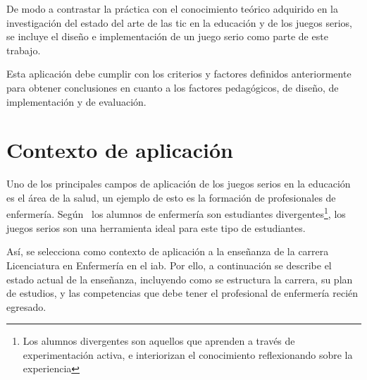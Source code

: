 De modo a contrastar la práctica con el conocimiento teórico adquirido en la
investigación del estado del arte de las \gls{tic} en la educación y de los
juegos serios, se incluye el diseño e implementación de un juego serio como
parte de este trabajo.

Esta aplicación debe cumplir con los criterios y factores definidos
anteriormente para obtener conclusiones en cuanto a los factores pedagógicos, de
diseño, de implementación y de evaluación.

\section{Contexto de aplicación} 

Uno de los principales campos de aplicación de los juegos serios en la educación
es el área de la salud, un ejemplo de esto es la formación de profesionales de
enfermería. Según~\cite{humphreys2013developing} los alumnos de enfermería son
estudiantes divergentes\footnote{Los alumnos divergentes son aquellos que
    aprenden a través de experimentación activa, e interiorizan el conocimiento
    reflexionando sobre la experiencia\cite{humphreys2013developing}}, los
juegos serios son una herramienta ideal para este tipo de
estudiantes\cite{humphreys2013developing}. 

Así, se selecciona como contexto de aplicación a la enseñanza de la carrera
Licenciatura en Enfermería en el \Gls{iab}. Por ello, a continuación se describe el estado
actual de la enseñanza, incluyendo como se estructura la carrera, su plan de estudios, y
las competencias que debe tener el profesional de enfermería recién egresado.



